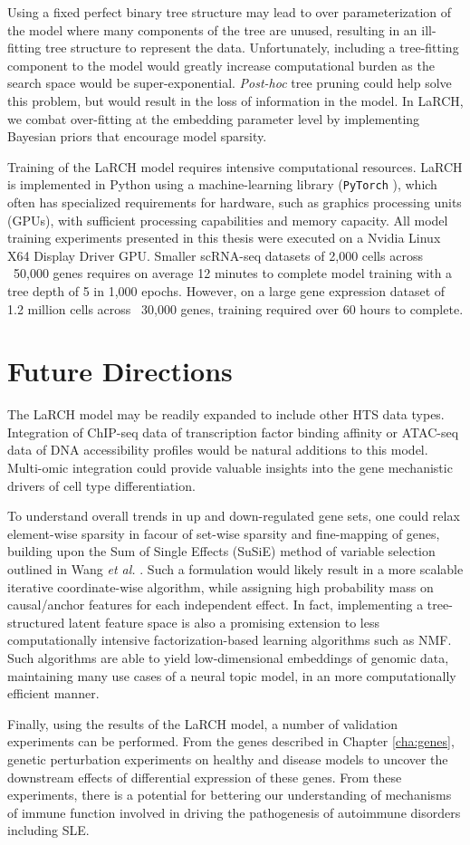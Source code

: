 Using a fixed perfect binary tree structure may lead to over parameterization of the model where many components of the tree are unused, resulting in an ill-fitting tree structure to represent the data. Unfortunately, including a tree-fitting component to the model would greatly increase computational burden as the search space would be super-exponential. \textit{Post-hoc} tree pruning could help solve this problem, but would result in the loss of information in the model. In LaRCH, we combat over-fitting at the embedding parameter level by implementing Bayesian priors that encourage model sparsity.

Training of the LaRCH model requires intensive computational resources. LaRCH is implemented in Python using a machine-learning library (\texttt{PyTorch} \cite{pytorch}), which often has specialized requirements for hardware, such as graphics processing units (GPUs), with sufficient processing capabilities and memory capacity. All model training experiments presented in this thesis were executed on a Nvidia Linux X64 Display Driver GPU. Smaller scRNA-seq datasets of 2,000 cells across ~50,000 genes requires on average 12 minutes to complete model training with a tree depth of 5 in 1,000 epochs. However, on a large gene expression dataset of 1.2 million cells across ~30,000 genes, training required over 60 hours to complete.

\section{Future Directions}
The LaRCH model may be readily expanded to include other HTS data types. Integration of ChIP-seq data of transcription factor binding affinity or ATAC-seq data of DNA accessibility profiles would be natural additions to this model. Multi-omic integration could provide valuable insights into the gene mechanistic drivers of cell type differentiation. 

To understand overall trends in up and down-regulated gene sets, one could relax element-wise sparsity in facour of set-wise sparsity and fine-mapping of genes, building upon the Sum of Single Effects (SuSiE) method of variable selection outlined in Wang \textit{et al.} \cite{susie}. Such a formulation would likely result in a more scalable iterative coordinate-wise algorithm, while assigning high probability mass on causal/anchor features for each independent effect. In fact, implementing a tree-structured latent feature space is also a promising extension to less computationally intensive factorization-based learning algorithms such as NMF. Such algorithms are able to yield low-dimensional embeddings of genomic data, maintaining many use cases of a neural topic model, in an more computationally efficient manner. 

Finally, using the results of the LaRCH model, a number of validation experiments can be performed. From the genes described in Chapter \ref{cha:genes}, genetic perturbation experiments on healthy and disease models to uncover the downstream effects of differential expression of these genes. From these experiments, there is a potential for bettering our understanding of mechanisms of immune function involved in driving the pathogenesis of autoimmune disorders including SLE.